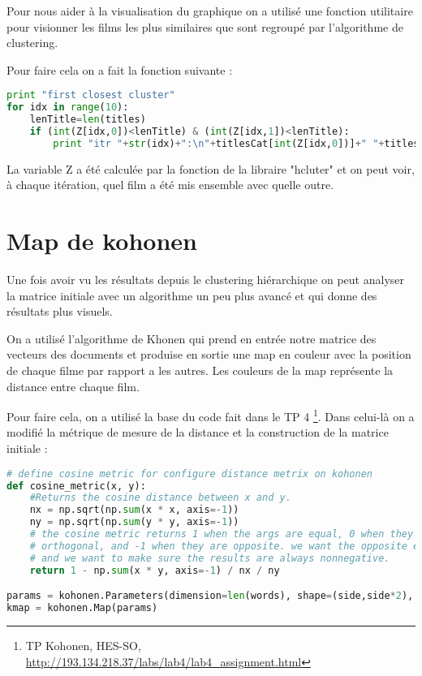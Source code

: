 Pour nous aider à la visualisation du graphique on a utilisé une fonction utilitaire pour visionner les films les plus similaires que sont regroupé par l'algorithme de clustering.

Pour faire cela on a fait la fonction suivante : \\

\begin{lstlisting}[language=python]
print "first closest cluster"
for idx in range(10):
    lenTitle=len(titles)
    if (int(Z[idx,0])<lenTitle) & (int(Z[idx,1])<lenTitle):
        print "itr "+str(idx)+":\n"+titlesCat[int(Z[idx,0])]+" "+titlesCat[int(Z[idx,1])]
\end{lstlisting}

La variable Z a été calculée par la fonction de la libraire "hcluter" et on peut voir, à chaque itération, quel film a été mis ensemble avec quelle outre.	


\section{Map de kohonen}

Une fois avoir vu les résultats depuis le clustering hiérarchique on peut analyser la matrice initiale avec un algorithme un peu plus avancé et qui donne des résultats plus visuels.

On a utilisé l'algorithme de Khonen qui prend en entrée notre matrice des vecteurs des documents et produise en sortie une map en couleur avec la position de chaque filme par rapport a les autres. Les couleurs de la map représente la distance entre chaque film. 

Pour faire cela, on a utilisé la base du code fait dans le TP 
4 \footnote{TP Kohonen, HES-SO, \url{http://193.134.218.37/labs/lab4/lab4_assignment.html}}. Dans celui-là  on a modifié la métrique de mesure de la distance et la construction de la matrice initiale : \\

\begin{lstlisting}[language=python]
# define cosine metric for configure distance metrix on kohonen
def cosine_metric(x, y):
	#Returns the cosine distance between x and y.
	nx = np.sqrt(np.sum(x * x, axis=-1))
	ny = np.sqrt(np.sum(y * y, axis=-1))
	# the cosine metric returns 1 when the args are equal, 0 when they are
	# orthogonal, and -1 when they are opposite. we want the opposite effect,
	# and we want to make sure the results are always nonnegative.
	return 1 - np.sum(x * y, axis=-1) / nx / ny

params = kohonen.Parameters(dimension=len(words), shape=(side,side*2), metric=cosine_metric)
kmap = kohonen.Map(params)
\end{lstlisting}




